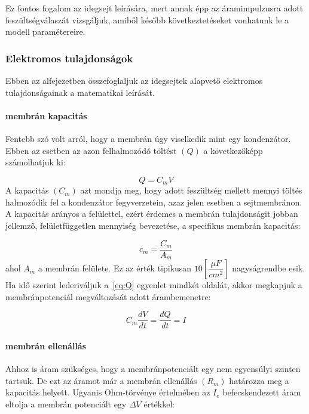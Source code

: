 Ez fontos fogalom az idegsejt leírására, mert annak épp az áramimpulzusra adott feszültségválaszát vizsgáljuk, amiből később következtetéseket vonhatunk le a modell paramétereire.



\subsubsection{Elektromos tulajdonságok}
Ebben az alfejezetben összefoglaljuk az idegsejtek alapvető elektromos tulajdonságainak a matematikai leírását.

\paragraph{membrán kapacitás}
Fentebb szó volt arról, hogy a membrán úgy viselkedik mint egy kondenzátor. Ebben az esetben az azon felhalmozódó töltést $(Q)$ a következőképp számolhatjuk ki:

\begin{equation}\label{eq:Q}
	Q = C_m V 
\end{equation}
A kapacitás $(C_m)$ azt mondja meg, hogy adott feszültség mellett mennyi töltés halmozódik fel a kondenzátor fegyverzetein, azaz jelen esetben a sejtmembránon. A kapacitás arányos a felülettel, ezért érdemes a membrán tulajdonságit jobban jellemző, felületfüggetlen mennyiség bevezetése, a specifikus membrán kapacitás:

\begin{equation}\label{eq:cm}
	c_m = \frac{C_m}{A_m}
\end{equation}
ahol $A_m$ a membrán felülete. Ez az érték tipikusan $10 \left[ \dfrac{\mu F}{cm^2}\right]$ nagyságrendbe esik.
Ha idő szerint lederiváljuk a~\ref{eq:Q} egyenlet mindkét oldalát, akkor megkapjuk a membránpotenciál megváltozását adott árambemenetre:

\begin{equation}\label{eq:dV}
	C_m \dfrac{dV}{dt} = \dfrac{dQ}{dt} = I
\end{equation}

\paragraph{membrán ellenállás}
Ahhoz is áram szükséges, hogy a membránpotenciált egy nem egyensúlyi szinten tartsuk. De ezt az áramot már a membrán ellenállás $(R_m)$ határozza meg a kapacitás helyett. Ugyanis Ohm-törvénye értelmében az $I_e$ befecskendezett áram eltolja a membrán potenciált egy $\Delta V$ értékkel:

